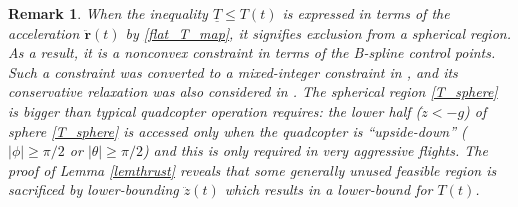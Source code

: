 \documentclass[journal,10pt]{IEEEtran}
\newtheorem{remark}{\bfseries Remark}
\newcommand{\vect}[1]{\boldsymbol{\mathbf{#1}}}
\newif\ifdraft
\newcommand{\XX}[1]{\ifdraft{\color{red}[{\bf XX}: #1]}\fi}
\newcommand{\VF}[1]{\ifdraft{\color{blue}[{\bf VF}: #1]}\fi}
\begin{document}

\begin{remark}
When the inequality $\underline{T}\leq T(t)$ is expressed in terms of the acceleration $\ddot{\vect{r}}(t)$ by \eqref{flat_T_map}, it signifies exclusion from a spherical region. As a result, it is a nonconvex constraint in terms of the B-spline control points. 
Such a constraint was converted to a mixed-integer constraint in \cite{Constrained_trajectory}, and its conservative relaxation  was also considered in \cite{mueller2013model}. The spherical region \eqref{T_sphere} is bigger than typical quadcopter operation requires: the lower half ($\ddot{z} < -g$) of sphere \eqref{T_sphere} is accessed only when the quadcopter is ``upside-down'' ($|\phi|\geq \pi/2$ or $|\theta| \geq \pi/2$) and this is only required in very aggressive flights. The proof of Lemma \ref{lemthrust} reveals that some  generally unused feasible region is  sacrificed by lower-bounding $\ddot{z}(t)$ which results in a lower-bound for $T(t)$. 
\end{remark}
\end{document}
